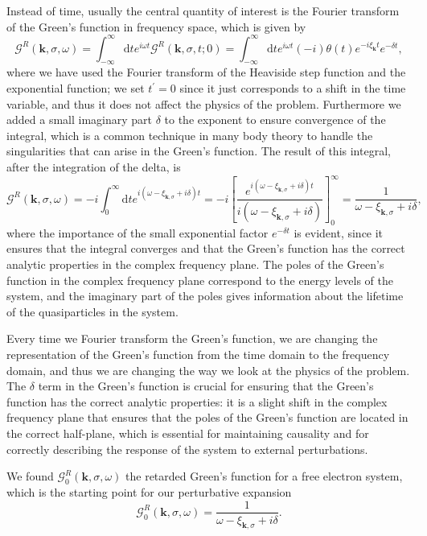 Instead of time, usually the central quantity of interest is the Fourier transform of the Green's function in frequency space, which is given by
\[
    \mathcal{G}^R(\mathbf{k}, \sigma, \omega) = \int_{-\infty}^{\infty} \mathrm{d} t e^{i \omega t} \mathcal{G}^R(\mathbf{k}, \sigma, t; 0) = \int_{-\infty}^{\infty} \mathrm{d} t e^{i \omega t} (-i) \theta(t) e^{-i \xi_{\mathbf{k}} t} e^{- \delta t},
\]
where we have used the Fourier transform of the Heaviside step function and the exponential function; we set \(t^{\prime} = 0\) since it just corresponds to a shift in the time variable, and thus it does not affect the physics of the problem. Furthermore we added a small imaginary part \(\delta\) to the exponent to ensure convergence of the integral, which is a common technique in many body theory to handle the singularities that can arise in the Green's function. The result of this integral, after the integration of the delta, is
\[
    \mathcal{G}^R(\mathbf{k}, \sigma, \omega) = -i \int_0^{\infty} \mathrm{d} t e^{i (\omega - \xi_{\mathbf{k}, \sigma} + i \delta) t} = -i \left[ \frac{e^{i (\omega - \xi_{\mathbf{k}, \sigma} + i \delta) t}}{i (\omega - \xi_{\mathbf{k}, \sigma} + i \delta)} \right]_0^{\infty} = \frac{1}{\omega - \xi_{\mathbf{k}, \sigma} + i \delta},
\]
where the importance of the small exponential factor \(e^{- \delta t}\) is evident, since it ensures that the integral converges and that the Green's function has the correct analytic properties in the complex frequency plane. The poles of the Green's function in the complex frequency plane correspond to the energy levels of the system, and the imaginary part of the poles gives information about the lifetime of the quasiparticles in the system.

Every time we Fourier transform the Green's function, we are changing the representation of the Green's function from the time domain to the frequency domain, and thus we are changing the way we look at the physics of the problem. The \(\delta\) term in the Green's function is crucial for ensuring that the Green's function has the correct analytic properties: it is a slight shift in the complex frequency plane that ensures that the poles of the Green's function are located in the correct half-plane, which is essential for maintaining causality and for correctly describing the response of the system to external perturbations.

We found \(\mathcal{G}_0^R(\mathbf{k}, \sigma, \omega)\) the retarded Green's function for a free electron system, which is the starting point for our perturbative expansion
\[
    \mathcal{G}_0^R(\mathbf{k}, \sigma, \omega) = \frac{1}{\omega - \xi_{\mathbf{k}, \sigma} + i \delta}.
\]

